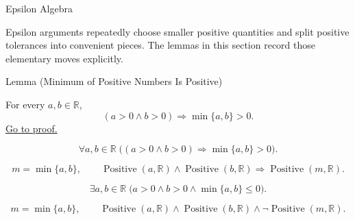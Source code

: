 \begin{topicbox}{Epsilon Algebra}
\begin{exposition}
Epsilon arguments repeatedly choose smaller positive quantities and split
positive tolerances into convenient pieces. The lemmas in this section record
those elementary moves explicitly.
\end{exposition}
\end{topicbox}

\begin{lemmabox}{Lemma (Minimum of Positive Numbers Is Positive)}
\begin{lemma}
\label{lem:minimum-of-positive-numbers-is-positive}
For every $a,b\in\mathbb{R}$,
\[
  (a>0\land b>0)
  \Longrightarrow
  \min\{a,b\}>0.
\]
\hyperref[prf:minimum-of-positive-numbers-is-positive]{Go to proof.}
\end{lemma}
\end{lemmabox}
\begin{remark*}
\[
\forall a,b\in\mathbb{R}\;\bigl((a>0\land b>0)\Longrightarrow \min\{a,b\}>0\bigr).
\]
\end{remark*}
\begin{remark*}
\[
m=\min\{a,b\},\qquad
\operatorname{Positive}(a,\mathbb{R})\land\operatorname{Positive}(b,\mathbb{R})
\Longrightarrow \operatorname{Positive}(m,\mathbb{R}).
\]
\end{remark*}
\begin{remark*}
\[
\exists a,b\in\mathbb{R}\;\bigl(a>0\land b>0\land \min\{a,b\}\leq 0\bigr).
\]
\end{remark*}
\begin{remark*}
\[
m=\min\{a,b\},\qquad
\operatorname{Positive}(a,\mathbb{R})\land\operatorname{Positive}(b,\mathbb{R})\land
\neg\operatorname{Positive}(m,\mathbb{R}).
\]
\end{remark*}

